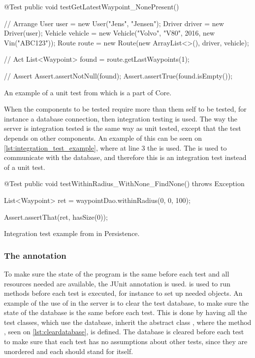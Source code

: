 \begin{listing}
    \begin{java2}
        @Test
        public void testGetLatestWaypoint_NonePresent() {
            // Arrange
            User user = new User("Jens", "Jensen");
            Driver driver = new Driver(user);
            Vehicle vehicle = new Vehicle("Volvo", "V80", 2016, new Vin("ABC123"));
            Route route = new Route(new ArrayList<>(), driver, vehicle);

            // Act
            List<Waypoint> found = route.getLastWaypoints(1);

            // Assert
            Assert.assertNotNull(found);
            Assert.assertTrue(found.isEmpty());
        }
    \end{java2}
    \caption{An example of a unit test from  which is a part of Core.}
    \label{lst:unit_test_example}
\end{listing}

\bigskip

When the components to be tested require more than them self to be tested, 
for instance a database connection,
then integration testing is used.
The way the server is integration tested is the same way as unit tested,
except that the test depends on other components.
An example of this can be seen on \cref{lst:integration_test_example},
where at line 3 the  is used.
The  is used to communicate with the database,
and therefore this is an integration test instead of a unit test.

\begin{listing}
    \begin{java2}
        @Test
        public void testWithinRadius_WithNone_FindNone() throws Exception {
            List<Waypoint> ret = waypointDao.withinRadius(0, 0, 100);

            Assert.assertThat(ret, hasSize(0));
        }
    \end{java2}
    \caption{Integration test example from  in Persistence.}
    \label{lst:integration_test_example}
\end{listing}

\subsubsection{The  annotation}
To make sure the state of the program is the same before each test and all resources needed are available,
the JUnit annotation  is used.
 is used to run methods before each test is executed, 
for instance to set up needed objects\cite{before_doc}.
An example of the use of  in the server is to clear the test database,
to make sure the state of the database is the same before each test.
This is done by having all the test classes, which use the database, inherit the abstract class ,
where the method , seen on \cref{lst:cleardatabase}, is defined.
The database is cleared before each test to make sure that each test has no assumptions about other tests, 
since they are unordered and each should stand for itself.


